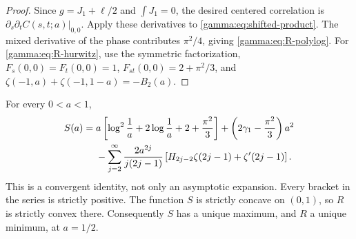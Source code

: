 \begin{proof}
Since $g=J_1+\ell/2$ and $\int J_1=0$, the desired centered correlation
is $\partial_s\partial_t C(s,t;a)|_{0,0}$.
Apply these derivatives to \eqref{gamma:eq:shifted-product}.
The mixed derivative of the phase contributes $\pi^2/4$, giving
\eqref{gamma:eq:R-polylog}.
For \eqref{gamma:eq:R-hurwitz}, use the symmetric factorization,
$F_s(0,0)=F_t(0,0)=1$, $F_{st}(0,0)=2+\pi^2/3$, and
$\zeta(-1,a)+\zeta(-1,1-a)=-B_2(a)$.
\end{proof}

\begin{theorem}
\label{gamma:thm:loggamma-concavity}
For every $0<a<1$,
\begin{align}
 S(a)={}&a\left[\log^2\frac1a+2\log\frac1a+2+\frac{\pi^2}{3}\right]
       +\left(2\gamma_1-\frac{\pi^2}{3}\right)a^2\notag\\
 &-\sum_{j=2}^{\infty}\frac{2a^{2j}}{j(2j-1)}
       \left[H_{2j-2}\zeta(2j-1)+\zeta'(2j-1)\right].
 \label{gamma:eq:loggamma-increment-series}
\end{align}
This is a convergent identity, not only an asymptotic expansion.
Every bracket in the series is strictly positive. The function $S$ is
strictly concave on $(0,1)$, so $R$ is strictly convex there. Consequently
$S$ has a unique maximum, and $R$ a unique minimum, at $a=1/2$.
\end{theorem}

